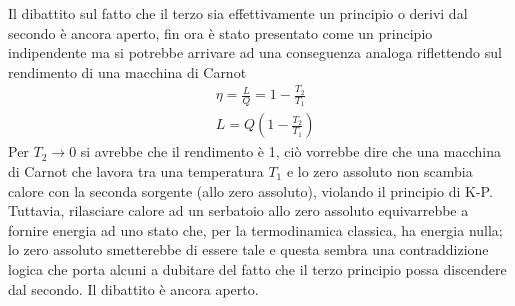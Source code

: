 \documentclass[
10pt, %
a4paper, %
oneside, %
headinclude,footinclude, %
BCOR5mm, %
]{scrartcl}
\begin{document}
Il dibattito sul fatto che il terzo sia effettivamente un principio o derivi dal secondo è ancora aperto, fin ora è stato presentato come un principio indipendente ma si potrebbe arrivare ad una conseguenza analoga riflettendo sul rendimento di una macchina di Carnot
\begin{align*}
	&\eta = \frac{L}{Q} = 1-\frac{T_2}{T_1}\\
	&L = Q\left(1-\frac{T_2}{T_1}\right)
\end{align*}
Per \(T_2\to 0\) si avrebbe che il rendimento è 1, ciò vorrebbe dire che una macchina di Carnot che lavora tra una temperatura \(T_1\) e lo zero assoluto non scambia calore con la seconda sorgente (allo zero assoluto), violando il principio di K-P. Tuttavia, rilasciare calore ad un serbatoio allo zero assoluto equivarrebbe a fornire energia ad uno stato che, per la termodinamica classica, ha energia nulla; lo zero assoluto smetterebbe di essere tale e questa sembra una contraddizione logica che porta alcuni a dubitare del fatto che il terzo principio possa discendere dal secondo. Il dibattito è ancora aperto.  
\newpage
\end{document}
